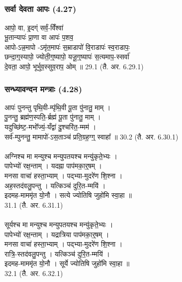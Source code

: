 \subsection{}
\subsubsection{सर्वा देवता आपः (4.27)}
आपो॒ वा, इ॒दग्ं सर्वं॒-विँश्वा॑ \\
भू॒तान्यापः॑ प्रा॒णा वा आपः॑ प॒शव॒ \\
आपो-ऽन्न॒मापो -ऽमृ॑त॒मापः॑ स॒म्राडापो॑ वि॒राडापः॑ स्व॒राडापः॒\\
छन्दा॒ग्॒स्यापो॒ ज्योती॒ग्॒ष्यापो॒ यजू॒ग्॒ष्यापः॑ स॒त्यमाप॒-स्सर्वा॑ \\
दे॒वता॒ आपो॒ भूर्भुव॒स्सुव॒राप॒ ओम् ॥ 29.1 (तै. अर. 6.29.1)

\subsubsection{सन्ध्यावन्दन मन्त्राः (4.28)}
आपः॑ पुनन्तु पृथि॒वी-म्पृ॑थि॒वी पू॒ता पु॑नातु॒ माम् ।\\
पु॒नन्तु॒ ब्रह्म॑ण॒स्पति॒-र्ब्रह्म॑ पू॒ता पु॑नातु॒ माम् ।\\
यदुच्छि॑ष्ट॒-मभो᳚ज्यं॒-यँद्वा॑ दु॒श्चरि॑त॒-म्मम॑ ।\\
सर्व॑-म्पुनन्तु॒ मामापो॑-ऽस॒ताञ्च॑ प्रति॒ग्रह॒ग्ग्॒ स्वाहा᳚ ॥ 30.2 (तै. अर. 6.30.1)\\
\\
अग्निश्च मा मन्युश्च मन्युपतयश्च मन्यु॑कृते॒भ्यः ।\\
पापेभ्यो॑ रक्ष॒न्ताम् । यदह्ना पाप॑मका॒र्॒षम् ।\\
मनसा वाचा॑ हस्ता॒भ्याम् । पद्भ्या-मुदरे॑ण शि॒श्ना ।\\
अह॒स्तद॑वलु॒पन्तु । यत्किञ्च॑ दुरि॒त-म्मयि॑ ।\\
इदमह-माममृ॑त यो॒नौ । सत्ये ज्योतिषि जुहो॑मि स्वा॒हा ॥ \\
31.1 (तै. अर. 6.31.1)\\
\\
सूर्यश्च मा मन्युश्च मन्युपतयश्च मन्यु॑कृते॒भ्यः ।\\
पापेभ्यो॑ रक्ष॒न्ताम् । यद्रात्रिया पाप॑मका॒र्॒षम् ।\\
मनसा वाचा॑ हस्ता॒भ्याम् । पद्भ्या-मुदरे॑ण शि॒श्ना ।\\
रात्रि॒-स्तद॑वलु॒पन्तु । यत्किञ्च॑ दुरि॒त-म्मयि॑ ।\\
इदमह-माममृ॑त यो॒नौ । सूर्ये ज्योतिषि जुहो॑मि स्वा॒हा ॥ \\
32.1 (तै. अर. 6.32.1)\\


